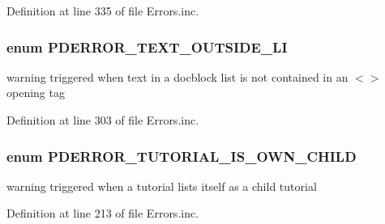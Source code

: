 \-Definition at line 335 of file \-Errors.\-inc.

\hypertarget{_errors_8inc_ab94621f0c43c5ba5aa95ed39d7ca5c16}{
\subsubsection[{\-P\-D\-E\-R\-R\-O\-R\-\_\-\-T\-E\-X\-T\-\_\-\-O\-U\-T\-S\-I\-D\-E\-\_\-\-L\-I}]{\setlength{\rightskip}{0pt plus 5cm}enum {\bf \-P\-D\-E\-R\-R\-O\-R\-\_\-\-T\-E\-X\-T\-\_\-\-O\-U\-T\-S\-I\-D\-E\-\_\-\-L\-I}}}\label{_errors_8inc_ab94621f0c43c5ba5aa95ed39d7ca5c16}
warning triggered when text in a docblock list is not contained in an $<$$>$ opening tag 

\-Definition at line 303 of file \-Errors.\-inc.

\hypertarget{_errors_8inc_afec444a7b9e3b4a0b1b04bb1f03a29b5}{
\subsubsection[{\-P\-D\-E\-R\-R\-O\-R\-\_\-\-T\-U\-T\-O\-R\-I\-A\-L\-\_\-\-I\-S\-\_\-\-O\-W\-N\-\_\-\-C\-H\-I\-L\-D}]{\setlength{\rightskip}{0pt plus 5cm}enum {\bf \-P\-D\-E\-R\-R\-O\-R\-\_\-\-T\-U\-T\-O\-R\-I\-A\-L\-\_\-\-I\-S\-\_\-\-O\-W\-N\-\_\-\-C\-H\-I\-L\-D}}}\label{_errors_8inc_afec444a7b9e3b4a0b1b04bb1f03a29b5}
warning triggered when a tutorial lists itself as a child tutorial 

\-Definition at line 213 of file \-Errors.\-inc.

